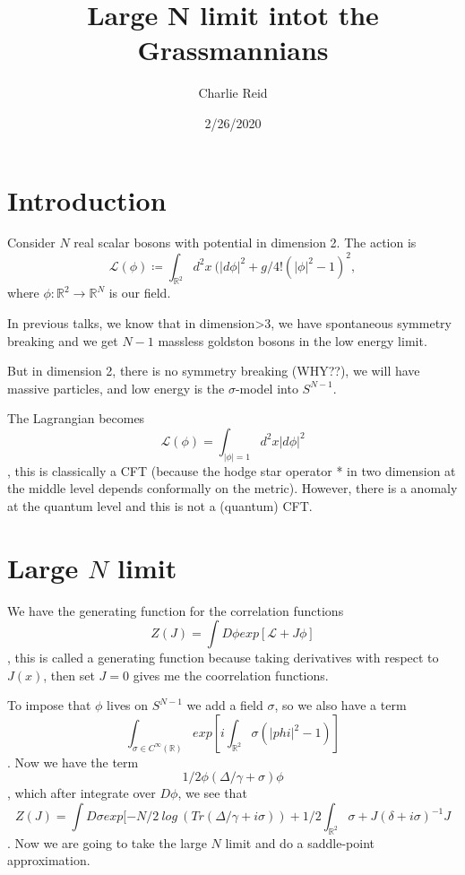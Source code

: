 \documentclass[../main.tex]{subfiles}
\title{Large N limit intot the Grassmannians}
\author{Charlie Reid}
\date{2/26/2020}
\begin{document}
\maketitle
\tableofcontents

\section{Introduction}

Consider $N$ real scalar bosons with potential in dimension 2. The action is $$\mathcal{L} (\phi) \coloneqq \int_{\mathbb{R}^2} d^2x \ (|d\phi|^2 + g/4! (|\phi|^2-1)^2,$$ where $\phi:\mathbb{R}^2 \rightarrow \mathbb{R}^N$ is our field.

In previous talks, we know that in dimension>3, we have spontaneous symmetry breaking and we get $N-1$ massless goldston bosons in the low energy limit.

But in dimension 2, there is no symmetry breaking (WHY??), we will have massive particles, and low energy is the $\sigma$-model into $S^{N-1}$.

The Lagrangian becomes 
$$\mathcal{L} (\phi) = \int_{|\phi|=1} d^2x |d\phi|^2$$, this is classically a CFT (because the hodge star operator * in two dimension at the middle level depends conformally on the metric). However, there is a anomaly at the quantum level and this is not a (quantum) CFT.

\section{Large $N$ limit}

We have the generating function for the correlation functions $$Z(J) = \int D\phi exp[\mathcal{L} + J\phi]$$, this is called a generating function because taking derivatives with respect to $J(x)$, then set $J = 0$ gives me the coorrelation functions.

To impose that $\phi$ lives on $S^{N-1}$ we add a field $\sigma$, so we also have a term $$\int_{\sigma \in C^{\infty}(\mathbb{R})} exp[i\int_{\mathbb{R}^2} \sigma(|phi|^2-1)]$$. Now we have the term $$1/2\phi(\Delta/\gamma +\sigma) \phi$$, which after integrate over $D\phi$, we see that 
$$Z(J) = \int D\sigma exp[-N/2 \ log\  (Tr (\Delta/\gamma + i \sigma)) + 1/2 \int_{\mathbb{R}^2} \sigma + J(\delta + i\sigma)^{-1}J$$. Now we are going to take the large $N$ limit and do a saddle-point approximation.
\end{document}
